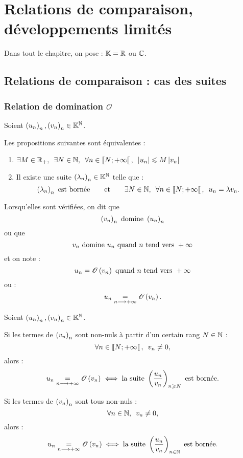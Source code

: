 \chapter{Relations de comparaison, développements limités}

\minitoc

Dans tout le chapitre, on pose : \(\mathbb{K}=\mathbb{R}\) ou \(\mathbb{C}\).

\section{Relations de comparaison : cas des suites}

\subsection{Relation de domination \(\mathscr{O}\)}

\begin{defprop}
Soient \(\left(u_n\right)_n,\left(v_n\right)_n\in\mathbb{K}^{\mathbb{N}}\).

Les propositions suivantes sont équivalentes :

\begin{enumerate}
    \item \(\quantifs{\exists M\in\Rp;\exists N\in\N;\forall n\in\interventierie{N}{\pinf}}\abs{u_n}\leq M\abs{v_n}\) \\
    \item Il existe une suite \(\left(\lambda_n\right)_n\in\mathbb{K}^{\mathbb{N}}\) telle que : \[\paren{\lambda_n}_n\text{ est bornée}\qquad\text{et}\qquad\quantifs{\exists N\in\N;\forall n\in\interventierie{N}{\pinf}}u_n=\lambda v_n.\]
\end{enumerate}

Lorsqu'elles sont vérifiées, on dit que \[\left(v_n\right)_n\text{ domine }\left(u_n\right)_n\] ou que \[v_n\text{ domine }u_n\text{ quand }n\text{ tend vers }+\infty\] et on note : \[u_n=\mathscr{O}\left(v_n\right)\text{ quand }n\text{ tend vers }+\infty\] ou : \[u_n\underset{n\longrightarrow+\infty}{=}\mathscr{O}\left(v_n\right).\]
\end{defprop}

\begin{prop}
Soient \(\left(u_n\right)_n,\left(v_n\right)_n\in\mathbb{K}^{\mathbb{N}}\).

Si les termes de \(\left(v_n\right)_n\) sont non-nuls à partir d'un certain rang \(N\in\mathbb{N}\) : \[\quantifs{\forall n\in\interventierie{N}{\pinf}}v_n\not=0,\] alors : \[u_n\underset{n\longrightarrow+\infty}{=}\mathscr{O}\left(v_n\right)\iff\text{la suite }\left(\dfrac{u_n}{v_n}\right)_{n\geqslant N}\text{ est bornée}.\]

Si les termes de \(\left(v_n\right)_n\) sont tous non-nuls : \[\quantifs{\forall n\in\N}v_n\not=0,\] alors : \[u_n\underset{n\longrightarrow+\infty}{=}\mathscr{O}\left(v_n\right)\iff\text{la suite }\left(\dfrac{u_n}{v_n}\right)_{n\in\mathbb{N}}\text{ est bornée}.\]
\end{prop}

